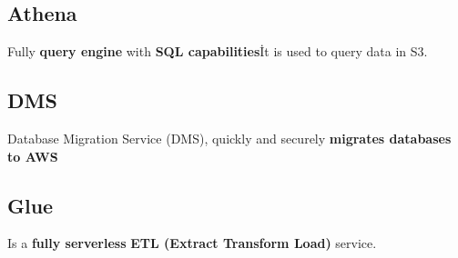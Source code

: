 \subsection{Athena}\label{subsec:athena}
Fully \textbf{query engine} with \textbf{SQL capabilities}\.
It is used to query data in S3.

\subsection{DMS}\label{subsec:dms}
Database Migration Service (DMS), quickly and securely \textbf{migrates databases to AWS}\.

\subsection{Glue}\label{subsec:glue}
Is a \textbf{fully serverless} \textbf{ETL (Extract Transform Load)} service.
